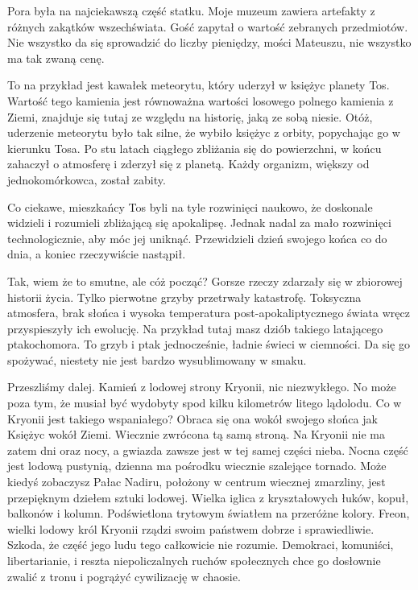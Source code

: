 Pora była na najciekawszą część statku.
Moje muzeum zawiera artefakty z różnych zakątków wszechświata. Gość zapytał o wartość zebranych przedmiotów.
Nie wszystko da się sprowadzić do liczby pieniędzy, mości Mateuszu, nie wszystko ma tak zwaną cenę. 

To na przykład jest kawałek meteorytu, który uderzył w księżyc planety Tos. Wartość tego kamienia jest równoważna wartości losowego polnego kamienia z Ziemi, 
znajduje się tutaj ze względu na historię, jaką ze sobą niesie.
Otóż, uderzenie meteorytu było tak silne, że wybiło księżyc z orbity, popychając go w kierunku Tosa.
Po stu latach ciągłego zbliżania się do powierzchni, w końcu zahaczył o atmosferę i zderzył się z planetą.
Każdy organizm, większy od jednokomórkowca, został zabity.

Co ciekawe, mieszkańcy Tos byli na tyle rozwinięci naukowo, że doskonale widzieli i rozumieli zbliżającą się apokalipsę.
Jednak nadal za mało rozwinięci technologicznie, aby móc jej uniknąć.
Przewidzieli dzień swojego końca co do dnia, a koniec rzeczywiście nastąpił.

Tak, wiem że to smutne, ale cóż począć? Gorsze rzeczy zdarzały się w zbiorowej historii życia. 
Tylko pierwotne grzyby przetrwały katastrofę.
Toksyczna atmosfera, brak słońca i wysoka temperatura post-apokaliptycznego świata wręcz przyspieszyły ich ewolucję.
Na przykład tutaj masz dziób takiego latającego ptakochomora. To grzyb i ptak jednocześnie, ładnie świeci w ciemności.
Da się go spożywać, niestety nie jest bardzo wysublimowany w smaku.

Przeszliśmy dalej. Kamień z lodowej strony Kryonii, nic niezwykłego. 
No może poza tym, że musiał być wydobyty spod kilku kilometrów litego lądolodu.
Co w Kryonii jest takiego wspaniałego? Obraca się ona wokół swojego słońca jak Księżyc wokół Ziemi. 
Wiecznie zwrócona tą samą stroną.
Na Kryonii nie ma zatem dni oraz nocy, a gwiazda zawsze jest w tej samej części nieba.
Nocna część jest lodową pustynią, dzienna ma pośrodku wiecznie szalejące tornado.
Może kiedyś zobaczysz Pałac Nadiru, położony w centrum wiecznej zmarzliny, jest przepięknym dziełem sztuki lodowej.
Wielka iglica z kryształowych łuków, kopuł, balkonów i kolumn.
Podświetlona trytowym światłem na przeróżne kolory.
Freon, wielki lodowy król Kryonii rządzi swoim państwem dobrze i sprawiedliwie.
Szkoda, że część jego ludu tego całkowicie nie rozumie. 
Demokraci, komuniści, libertarianie, i reszta niepoliczalnych ruchów społecznych chce go dosłownie zwalić z tronu i pogrążyć cywilizację w chaosie.

